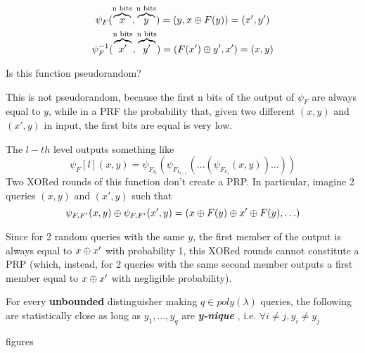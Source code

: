 \begin{gather*}
    \psi_{F}(\overbrace{x}^{\text{n bits}}, \overbrace{y}^{\text{n bits}})= (y,
    x \oplus F(y))=(x', y')\\
    \psi^{-1}_{F}(\overbrace{x'}^{\text{n bits}}, \overbrace{y'}^{\text{n
    bits}})= (F(x') \oplus y', x')=(x, y)
\end{gather*}

Is this function pseudorandom?

This is not pseudorandom, because the first n bits of the output of $\psi_{F}$
are always equal to $y$, while in a PRF the probability that, given two
different $(x, y)$ and $(x', y)$ in input, the first bits are equal is very
low.


The $l-th$ level outputs something like 
\[
    \psi_{F}[l](x,y)=\psi_{F_{k_{l}}}(\psi_{F_{k_{l-1}}}(...(\psi_{F_{k_{1}}}(x,y))...))
\]
Two XORed rounds of this function don't create a PRP. In particular, imagine 2 queries 
$(x, y)$ and $(x', y)$ such that
\begin{equation*}
    \psi_{F, F'}(x,y) \oplus  \psi_{F,F'}(x',y)=(x \oplus F(y) \oplus x' \oplus F(y), \ldots)
\end{equation*}

Since for 2 random queries with the same $y$, the first member of the output is always equal to  $x \oplus x'$ with probability 1, this XORed rounds cannot constitute a PRP (which, instead, for 2 queries with the same second member outputs a first member equal to $x \oplus x'$ with negligible probability).

\begin{lemma}
    For every \textbf{unbounded}  distinguisher making $q \in poly(\lambda)$
    queries, the following are statistically close as long as $y_{1}, \ldots,
    y_{q}$ are \textbf{ \textit{y-nique} } , i.e. $ \forall i \not= j, y_{i}
    \not= y_{j}$
\end{lemma}
figures

